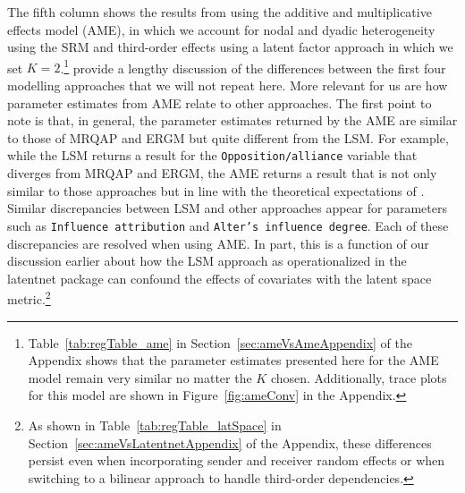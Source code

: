 \documentclass[12pt,pdflatex]{elsarticle}
\newcommand{\pkg}[1]{{\fontseries{b}\selectfont #1}}
\begin{document}
The fifth column shows the results from using the additive and multiplicative effects model (AME), in which we account for nodal and dyadic heterogeneity using the SRM and third-order effects using a latent factor approach in which we set $K=2$.\footnote{Table~\ref{tab:regTable_ame} in Section~\ref{sec:ameVsAmeAppendix} of the Appendix shows that the parameter estimates presented here for the AME model remain very similar no matter the $K$ chosen. Additionally, trace plots for this model are shown in Figure~\ref{fig:ameConv} in the Appendix.} \citet{cranmer:etal:2016} provide a lengthy discussion of the differences between the first four modelling approaches that we will not repeat here. More relevant for us are how parameter estimates from AME relate to other approaches. The first point to note is that, in general, the parameter estimates returned by the AME are similar to those of MRQAP and ERGM but quite different from the LSM. For example, while the LSM returns a result for the \texttt{Opposition/alliance} variable that diverges from MRQAP and ERGM, the AME returns a result that is not only similar to those approaches but in line with the theoretical expectations of \citet{ingold:fischer:2014}. Similar discrepancies between LSM and other approaches appear for parameters such as \texttt{Influence attribution} and \texttt{Alter's influence degree}. Each of these discrepancies are resolved when using AME. In part, this is a function of our discussion earlier about how the LSM approach as operationalized in the \pkg{latentnet} package can confound the effects of covariates with the latent space metric.\footnote{As shown in Table~\ref{tab:regTable_latSpace} in Section~\ref{sec:ameVsLatentnetAppendix} of the Appendix, these differences persist even when incorporating sender and receiver random effects or when switching to a bilinear approach to handle third-order dependencies.} %
\end{document}
